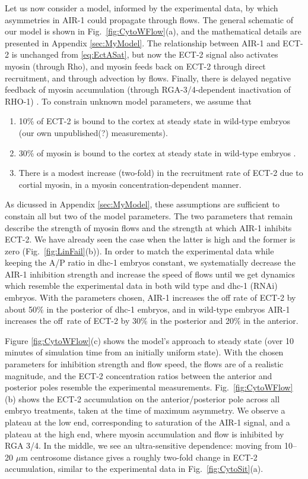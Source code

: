 \documentclass[11pt]{article}
\begin{document}
Let us now consider a model, informed by the experimental data, by which asymmetries in AIR-1 could propagate through flows. The general schematic of our model is shown in Fig.\ \ref{fig:CytoWFlow}(a), and the mathematical details are presented in Appendix \ref{sec:MyModel}. The relationship between AIR-1 and ECT-2 is unchanged from \eqref{eq:EctASat}, but now the ECT-2 signal also activates myosin (through Rho), and myosin feeds back on ECT-2 through direct recruitment, and through advection by flows. Finally, there is delayed negative feedback of myosin accumulation (through RGA-3/4-dependent inactivation of RHO-1) \citep{michaux2018excitable}. To constrain unknown model parameters, we assume that 
\begin{enumerate}
\item 10\% of ECT-2 is bound to the cortex at steady state in wild-type embryos (our own unpublished(?) measurements). 
\item 30\% of myosin is bound to the cortex at steady state in wild-type embryos \citep[Fig.~S3j]{gross2019guiding}.
\item There is a modest increase (two-fold) in the recruitment rate of ECT-2 due to cortial myosin, in a myosin concentration-dependent manner.
\end{enumerate}
As dicussed in Appendix \ref{sec:MyModel}, these assumptions are sufficient to constain all but two of the model parameters. The two parameters that remain describe the strength of myosin flows and the strength at which AIR-1 inhibits ECT-2. We have already seen the case when the latter is high and the former is zero (Fig.\ \ref{fig:LinFail}(b)). In order to match the experimental data while keeping the A/P ratio in dhc-1 embryos constant, we systematially decrease the AIR-1 inhibition strength and increase the speed of flows until we get dynamics which resemble the experimental data in both wild type and dhc-1 (RNAi) embryos. With the parameters chosen, AIR-1 increases the off rate of ECT-2 by about 50\% in the posterior of dhc-1 embryos, and in wild-type embryos AIR-1 increases the off~rate of ECT-2 by 30\% in the posterior and 20\% in the anterior.

Figure \ref{fig:CytoWFlow}(c) shows the model's approach to steady state (over 10 minutes of simulation time from an initially uniform state). With the chosen parameters for inhibition strength and flow speed, the flows are of a realistic magnitude, and the ECT-2 concentration ratios between the anterior and posterior poles resemble the experimental measurements. Fig.\ \ref{fig:CytoWFlow}(b) shows the ECT-2 accumulation on the anterior/posterior pole across all embryo treatments, taken at the time of maximum asymmetry. We observe a plateau at the low end, corresponding to saturation of the AIR-1 signal, and a plateau at the high end, where myosin accumulation and flow is inhibited by RGA 3/4. In the middle, we see an ultra-sensitive dependence: moving from 10--20 $\mu$m centrosome distance gives a roughly two-fold change in ECT-2 accumulation, similar to the experimental data in Fig.\ \ref{fig:CytoSit}(a). 
\end{document}
